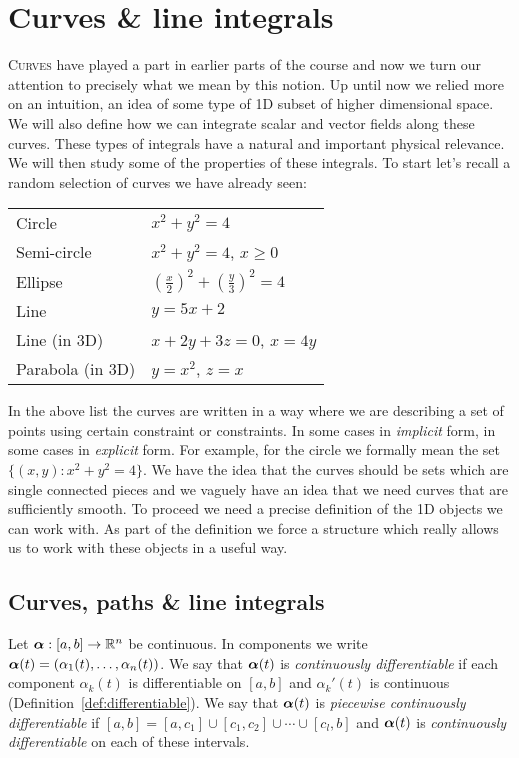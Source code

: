 \chapter{Curves \& line integrals}

\lettrine{C}{urves} have played a part in earlier parts of the course and now we turn our attention to precisely what we mean by this notion.
Up until now we relied more on an intuition, an idea of some type of 1D subset of higher dimensional space.
We will also define how we can integrate scalar and vector fields along these curves.
These types of integrals have a natural and important physical relevance.
We will then study some of the properties of these integrals.
To start let's recall a random selection of curves we have already seen:

\begin{center}
    \begin{tabular}{l l}
        Circle           & \(x^2+y^2 = 4\)                               \\
        Semi-circle      & \(x^2+y^2 = 4\), \(x\geq 0\)                  \\
        Ellipse          & \({(\frac{x}{2})}^2 + {(\frac{y}{3})}^2 = 4\) \\
        Line             & \(y=5x+2\)                                    \\
        Line (in 3D)     & \(x+2y+3z=0\), \(x=4y\)                       \\
        Parabola (in 3D) & \(y=x^2\), \(z=x\)
    \end{tabular}
\end{center}

\noindent
In the above list the curves are written in a way where we are describing a set of points using certain constraint or constraints. In some cases in \emph{implicit} form, in some cases in \emph{explicit} form.
For example, for the circle we formally mean the set  \(\{(x,y):x^2+y^2 = 4\}\).
We have the idea that the curves should be sets which are single connected pieces and we vaguely have an idea that we need curves that are sufficiently smooth.
To proceed we need a precise definition of the 1D objects we can work with.
As part of the definition we force a structure which really allows us to work with these objects in a useful way.

\section{Curves, paths \& line integrals}
Let \(\boldsymbol{\alpha} : [a,b] \to \mathbb{R}^n\) be continuous.
In components we write \(\boldsymbol{\alpha}(t) = (\alpha_1(t),\ldots,\alpha_n(t))\).
We say that \(\boldsymbol{\alpha}(t)\) is \emph{continuously differentiable} if each component \(\alpha_k(t)\) is differentiable on \([a,b]\) and \(\alpha_k'(t)\) is continuous (Definition~\ref{def:differentiable}).
We say that \(\boldsymbol{\alpha}(t)\) is \emph{piecewise continuously differentiable} if \([a,b] = [a,c_1]\cup[c_1,c_2] \cup \cdots \cup [c_l,b]\) and \(\boldsymbol{\alpha}(t)\) is \emph{continuously differentiable} on each of these intervals.

